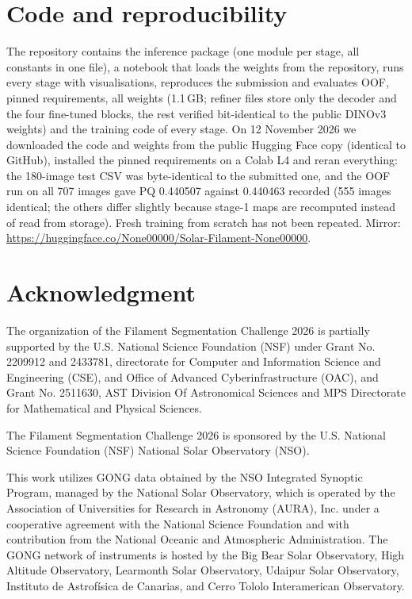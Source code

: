 \documentclass[sigconf]{acmart}
\begin{document}
\section{Code and reproducibility}\label{sec:code}
The repository contains the inference package (one module per stage, all constants in one file), a notebook that
loads the weights from the repository, runs every stage with visualisations, reproduces the submission and evaluates
OOF, pinned requirements, all weights (1.1\,GB; refiner files store only the decoder and the four fine-tuned blocks,
the rest verified bit-identical to the public DINOv3 weights) and the training code of every stage. On 12 November
2026 we downloaded the code and weights from the public Hugging Face copy (identical to GitHub), installed the pinned
requirements on a Colab L4 and reran everything: the 180-image test CSV was byte-identical to the submitted one, and
the OOF run on all 707 images gave PQ 0.440507 against 0.440463 recorded (555 images identical; the others differ
slightly because stage-1 maps are recomputed instead of read from storage). Fresh training from scratch has not been
repeated. Mirror: \url{https://huggingface.co/None00000/Solar-Filament-None00000}.

\section{Acknowledgment}\label{sec:acknowledgment}
    The organization of the Filament Segmentation Challenge 2026 is partially supported by the U.S. National Science Foundation (NSF) under Grant No. 2209912 and 2433781, directorate for Computer and Information Science and Engineering (CSE), and Office of Advanced Cyberinfrastructure (OAC), and Grant No. 2511630, AST Division Of Astronomical Sciences and MPS Directorate for Mathematical and Physical Sciences.

    The Filament Segmentation Challenge 2026 is sponsored by the U.S. National Science Foundation (NSF) National Solar Observatory (NSO).

    This work utilizes GONG data obtained by the NSO Integrated Synoptic Program, managed by the National Solar Observatory, which is operated by the Association of Universities for Research in Astronomy (AURA), Inc. under a cooperative agreement with the National Science Foundation and with contribution from the National Oceanic and Atmospheric Administration. The GONG network of instruments is hosted by the Big Bear Solar Observatory, High Altitude Observatory, Learmonth Solar Observatory, Udaipur Solar Observatory, Instituto de Astrofísica de Canarias, and Cerro Tololo Interamerican Observatory.



\end{document}
